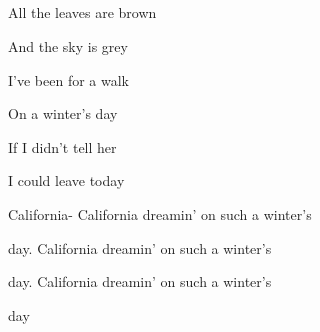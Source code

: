 \begin{song}
\bigskip

  \textbar\   \par
{}    \textbar\   \par
{}    \textbar\   \par
{}    \textbar\   \par

\bigskip

All the leaves are brown   \par
And the sky is grey  \par
I've been for a walk   \par
On a winter's day  \par
If I didn’t tell her   \par
I could leave today  \par

\bigskip

California- California dreamin’ on such a winter's \par
{}day. California dreamin’ on such a winter's \par
{}day. California dreamin’ on such a winter's \par
{} day \par
{} \par

\end{song}
